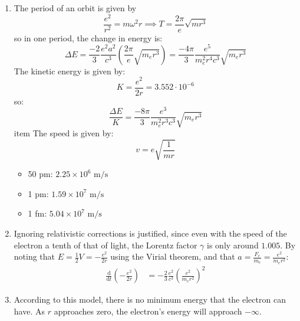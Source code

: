 \begin{sol}
\begin{enumerate}[label=\textbf{(\alph*)}]
    \item The period of an orbit is given by
    $$\frac{e^2}{r^2}=m\omega^2r \implies T = \frac{2\pi}{e}\sqrt{mr^3}$$
    so in one period, the change in energy is:
    $$\Delta E = \frac{-2}{3}\frac{e^2a^2}{c^3}\left(\frac{2\pi}{e}\sqrt{m_er^3}\right)=\frac{-4\pi}{3}\frac{e^5}{m_e^2r^4c^3}\sqrt{m_er^3}$$
    The kinetic energy is given by:
    $$K=\frac{e^2}{2r}=3.552\cdot 10^{-6}$$
    so:
    $$\frac{\Delta E}{K}=\frac{-8\pi}{3}\frac{e^3}{m_e^2r^3c^3}\sqrt{m_er^3}$$
    item The speed is given by:
    $$v=e\sqrt{\frac{1}{mr}}$$
    \begin{itemize}
        \item 50 pm: $2.25 \times 10^6 \text{ m/s}$
        \item 1 pm: $1.59 \times 10^7 \text{ m/s}$
        \item 1 fm: $5.04 \times 10^7 \text{ m/s}$
    \end{itemize}
    \item Ignoring relativistic corrections is justified, since even with the speed of the electron a tenth of that of light, the Lorentz factor $\gamma$ is only around $1.005$. By noting that $E = \frac{1}{2}V = -\frac{e^2}{2r}$ using the Virial theorem, and that $a = \frac{F_e}{m_e} = \frac{e^2}{m_e r^2}$:
\begin{align*}
    \frac{\mathrm{d}}{\mathrm{d}t}\left(-\frac{e^2}{2r}\right) &= -\frac{2}{3}\frac{e^2}{c^3}\left(\frac{e^2}{m_e r^2}\right)^2
\end{align*}
    \item According to this model, there is no minimum energy that the electron can have. As $r$ approaches zero, the electron's energy will approach $-\infty$.
\end{enumerate}

\end{sol}